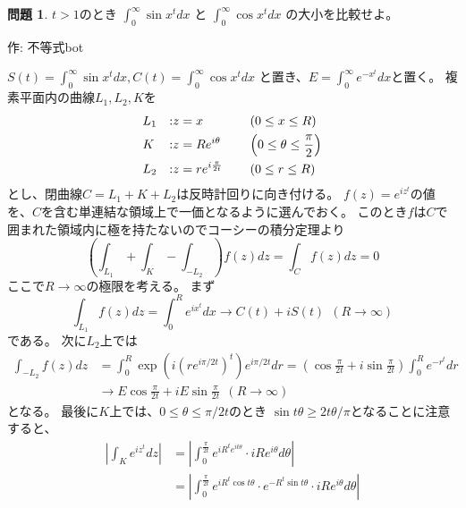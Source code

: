 \documentclass[uplatex, a5paper]{jsarticle}
\makeatletter
\theoremstyle{definition}
\newtheorem{prob}{問題}
\renewenvironment{proof}[1][\proofname]{
  \pushQED{\qed}%
  \normalfont \topsep6\p@\@plus6\p@\relax
  \trivlist
  \item[\hskip\labelsep
    #1\@addpunct{\textbf{.}}]\ignorespaces
}{%
  \popQED\endtrivlist\@endpefalse
}
\providecommand{\proofname}{証明}
\def\qed{\hfill $\Box$}
\makeatother
\begin{document}
\newpage

\begin{prob}
  \(t > 1\)のとき
  \(\displaystyle\int_0^\infty \sin{x^t} dx\)
  と
  \(\displaystyle\int_0^\infty \cos{x^t} dx\)
  の大小を比較せよ。
  \begin{flushright}
    作: 不等式bot
  \end{flushright}
\end{prob}


\begin{proof}
  \(S(t) = \displaystyle\int_0^\infty \sin{x^t} dx,
  C(t) = \displaystyle\int_0^\infty \cos{x^t} dx\)
  と置き、\(E=\displaystyle\int_0^\infty e^{-x^t} dx\)と置く。
  複素平面内の曲線\(L_1,L_2,K\)を
  \begin{alignat*}{4}
    &L_1 & : &z=x                       & \quad &\left( 0 \leq x \leq R \right) \notag \\
    &K   & : &z=Re^{i \theta }          &       &\left( 0 \leq \theta \leq \frac{\pi}{2} \right) \notag \\
    &L_2 & : &z=re^{i\frac{ \pi }{2t}}  &       &\left( 0 \leq r \leq R \right) \notag
  \end{alignat*}
  とし、閉曲線\(C=L_1+K+L_2\)は反時計回りに向き付ける。
  \(f(z)=e^{iz^t}\)の値を、\(C\)を含む単連結な領域上で一価となるように選んでおく。
  このとき\(f\)は\(C\)で囲まれた領域内に極を持たないのでコーシーの積分定理より
  \[
  \left( \int_{L_1} + \int_K - \int_{-L_2} \right) f(z) dz = \int_C f(z) dz = 0
  \]
  ここで\(R \to \infty\)の極限を考える。
  まず
  \[
  \int_{L_1} f(z) dz = \int_0^R e^{ix^t} dx \to C(t)+iS(t) \ \ ( R \to \infty )
  \]
  である。
  次に\(L_2\)上では
  \begin{align*}
    \int_{-L_2} f(z) dz &= \int_0^R \exp \left( i\left( re^{i\pi /2t} \right) ^t \right) e^{i\pi /2t} dr
    = \left(\cos \frac{\pi}{2t} + i \sin \frac{\pi}{2t} \right) \int_0^R e^{-r^t} dr  \\
    &\to E\cos \frac{\pi}{2t} + i E \sin \frac{\pi}{2t} \ \  ( R \to \infty )
  \end{align*}
  となる。
  最後に\(K\)上では、\(0 \leq \theta \leq \pi / 2t\)のとき
  \(\sin t\theta \geq 2t\theta / \pi\)となることに注意すると、
  \begin{align*}
    \left| \int_{K} e^{iz^t} dz \right|
    &= \left| \int_0^{\frac{\pi}{2t}} e^{iR^te^{it\theta}} \cdot iRe^{i\theta } d\theta \right| \\
    &= \left| \int_0^{\frac{\pi}{2t}} e^{iR^t\cos t\theta} \cdot e^{-R^t\sin t\theta}
    \cdot iRe^{i\theta } d\theta \right| \\

\end{align*}
\end{proof}
\end{document}
